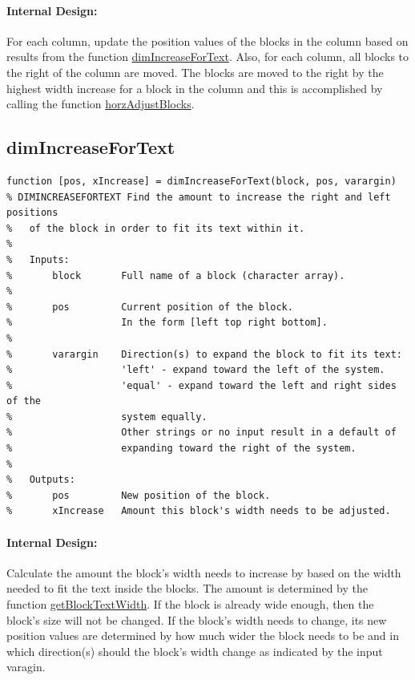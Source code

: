 \documentclass[12pt,letterpaper]{report}
\begin{document}
\paragraph{Internal Design:} For each column, update the position values of the blocks in the column based on results from the function \hyperref[dimIncreaseForText]{dimIncreaseForText}. Also, for each column, all blocks to the right of the column are moved. The blocks are moved to the right by the highest width increase for a block in the column and this is accomplished by calling the function \hyperref[horzAdjustBlocks]{horzAdjustBlocks}.

\subsection{dimIncreaseForText} \label{dimIncreaseForText}
\begin{lstlisting}
function [pos, xIncrease] = dimIncreaseForText(block, pos, varargin)
% DIMINCREASEFORTEXT Find the amount to increase the right and left positions
%   of the block in order to fit its text within it.
%
%   Inputs:
%       block       Full name of a block (character array).
%
%       pos         Current position of the block.
%                   In the form [left top right bottom].
%
%       varargin    Direction(s) to expand the block to fit its text:
%                   'left' - expand toward the left of the system.
%                   'equal' - expand toward the left and right sides of the
%                   system equally.
%                   Other strings or no input result in a default of
%                   expanding toward the right of the system.
%
%   Outputs:
%       pos         New position of the block.
%       xIncrease   Amount this block's width needs to be adjusted.
\end{lstlisting}
\paragraph{Internal Design:} Calculate the amount the block's width needs to increase by based on the width needed to fit the text inside the blocks. The amount is determined by the function \hyperref[getBlockTextWidth]{getBlockTextWidth}. If the block is already wide enough, then the block's size will not be changed. If the block's width needs to change, its new position values are determined by how much wider the block needs to be and in which direction(s) should the block's width change as indicated by the input varagin.
\end{document}
